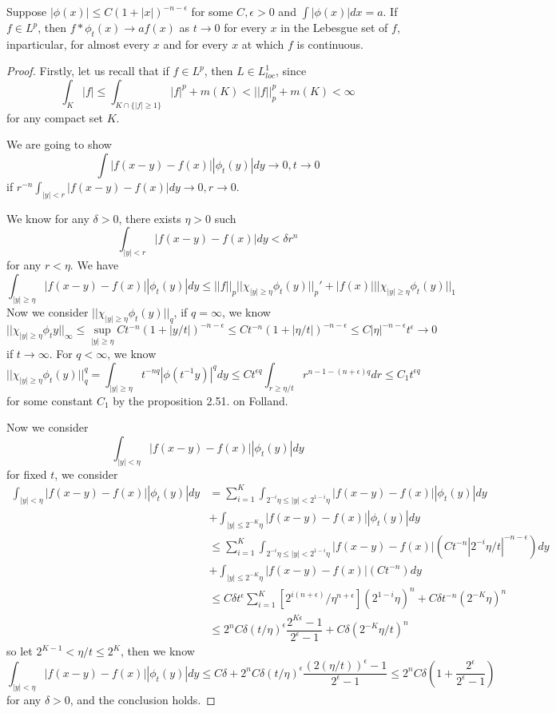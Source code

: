 \begin{theorem}
    Suppose $|\phi(x)|\leq C(1+|x|)^{-n-\epsilon}$ for some $C,\epsilon > 0$ and $\int |\phi(x)|dx = a$. If $f\in L^p$, then $f*\phi_t(x) \to af(x)$ as $t\to 0$ for every $x$ in the Lebesgue set of $f$, inparticular, for almost every $x$ and for every $x$ at which $f$ is continuous.
\end{theorem}
\begin{proof}\par
    Firstly, let us recall that if $f\in L^p$, then $L\in L^1_{loc}$, since
    \[
    \int_K |f| \leq \int_{K\cap\{|f|\geq 1\}} |f|^p + m(K) < ||f||_p^p + m(K) < \infty
    \]
    for any compact set $K$.\par
    We are going to show
    \[
    \int |f(x-y)-f(x)||\phi_t(y)|dy \to 0, t\to 0
    \]
    if $r^{-n}\int_{|y|<r} |f(x-y)-f(x)|dy \to 0, r\to 0$.\par
    We know for any $\delta > 0$, there exists $\eta>0$ such
    \[
    \int_{|y|<r} |f(x-y)-f(x)|dy < \delta r^{n}
    \]
    for any $r<\eta$. We have
    \[
    \int_{|y|\geq \eta} |f(x-y)-f(x)||\phi_t(y)|dy \leq ||f||_p||\chi_{|y|\geq \eta}\phi_t(y)||_p' + |f(x)|||\chi_{|y|\geq\eta}\phi_t(y)||_1
    \]
    Now we consider $||\chi_{|y|\geq\eta}\phi_t(y)||_q$, if $q= \infty$, we know
    \[
    ||\chi_{|y|\geq\eta}\phi_t{y}||_{\infty} \leq \sup_{|y|\geq\eta}Ct^{-n}(1+|y/t|)^{-n-\epsilon}  \leq Ct^{-n}(1+|\eta/t|)^{-n-\epsilon} \leq C|\eta|^{-n-\epsilon}t^{\epsilon} \to 0
    \]
    if $t\to\infty$. For $q<\infty$, we know
    \[
    ||\chi_{|y|\geq\eta} \phi_t(y)||_q^q = \int_{|y|\geq\eta} t^{-nq}|\phi(t^{-1}y)|^qdy \leq Ct^{\epsilon q}\int_{r\geq\eta/t} r^{n-1-(n+\epsilon)q} dr \leq C_1t^{\epsilon q}
    \]
    for some constant $C_1$ by the proposition 2.51. on Folland.\par
    Now we consider
    \[
    \int_{|y|<\eta} |f(x-y)-f(x)||\phi_t(y)|dy
    \]
    for fixed $t$, we consider
    \[
    \begin{aligned}
    \int_{|y|<\eta} |f(x-y)-f(x)||\phi_t(y)|dy
    &= \sum\limits_{i=1}^{K}\int_{2^{-i}\eta\leq|y|<2^{1-i}\eta} |f(x-y)-f(x)||\phi_t(y)|dy \\
    &+ \int_{|y|\leq 2^{-K}\eta} |f(x-y)-f(x)||\phi_t(y)|dy \\
    &\leq \sum\limits_{i=1}^{K}\int_{2^{-i}\eta\leq|y|<2^{1-i}\eta} |f(x-y)-f(x)|(Ct^{-n}|2^{-i}\eta/t|^{-n-\epsilon})dy \\
    &+ \int_{|y|\leq 2^{-K}\eta} |f(x-y)-f(x)|(Ct^{-n})dy \\
    &\leq C\delta t^{\epsilon}\sum\limits_{i=1}^K [2^{i(n+\epsilon)}/\eta^{n+\epsilon}](2^{1-i}\eta)^n + C\delta t^{-n}(2^{-K}\eta)^n \\
    &\leq 2^nC\delta(t/\eta)^{\epsilon}\dfrac{2^{K\epsilon}-1}{2^{\epsilon}-1}+ C\delta (2^{-K}\eta/t)^n 
    \end{aligned}
    \]
    so let $2^{K-1} < \eta/t \leq 2^K$, then we know
    \[\int_{|y|<\eta} |f(x-y)-f(x)||\phi_t(y)|dy \leq C\delta + 2^nC\delta(t/\eta)^{\epsilon}\dfrac{(2(\eta/t))^{\epsilon}-1}{2^{\epsilon}-1} \leq 2^nC\delta(1+\dfrac{2^{\epsilon}}{2^{\epsilon}-1})\]
    for any $\delta > 0$, and the conclusion holds.
\end{proof}

